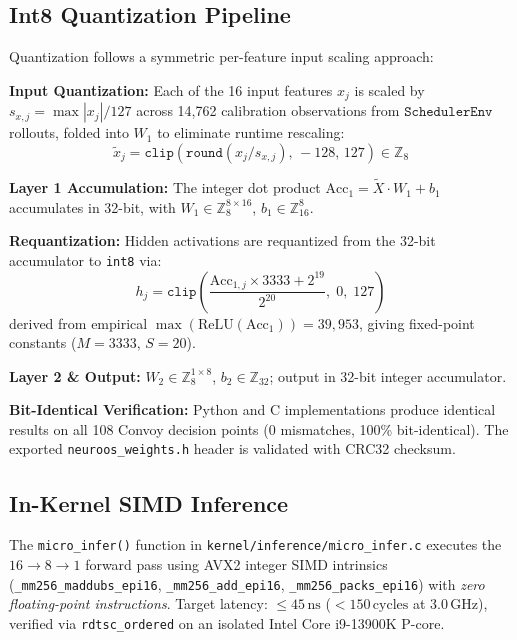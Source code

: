 \subsection{Int8 Quantization Pipeline}
\label{subsec:quant}

Quantization follows a symmetric per-feature input scaling approach:

\textbf{Input Quantization:} Each of the 16 input features $x_j$ is scaled by
$s_{x,j} = \max|x_j| / 127$ across 14{,}762 calibration observations from
$\texttt{SchedulerEnv}$ rollouts, folded into $W_1$ to eliminate runtime
rescaling:
\begin{equation}
  \tilde{x}_{j} = \texttt{clip}\!\left(\texttt{round}(x_j / s_{x,j}),\,-128,\,127\right) \in \mathbb{Z}_8
\end{equation}

\textbf{Layer 1 Accumulation:} The integer dot product
$\text{Acc}_1 = \tilde{X} \cdot W_1 + b_1$ accumulates in 32-bit, with
$W_1 \in \mathbb{Z}_8^{8\times16}$, $b_1 \in \mathbb{Z}_{16}^8$.

\textbf{Requantization:} Hidden activations are requantized from the 32-bit
accumulator to \texttt{int8} via:
\begin{equation}
  h_j = \texttt{clip}\!\left(\frac{\text{Acc}_{1,j} \times 3333 + 2^{19}}{2^{20}},\;0,\;127\right)
  \label{eq:requant}
\end{equation}
derived from empirical $\max(\text{ReLU}(\text{Acc}_1)) = 39{,}953$, giving
fixed-point constants ($M = 3333,\,S = 20$).

\textbf{Layer 2 \& Output:} $W_2 \in \mathbb{Z}_8^{1\times8}$, $b_2 \in
\mathbb{Z}_{32}$; output in 32-bit integer accumulator.

\textbf{Bit-Identical Verification:} Python and C implementations produce
identical results on all 108 Convoy decision points (0 mismatches, 100\%
bit-identical). The exported \texttt{neuroos\_weights.h} header is validated
with CRC32 checksum.

\subsection{In-Kernel SIMD Inference}
\label{subsec:simd}

The \texttt{micro\_infer()} function in \texttt{kernel/inference/micro\_infer.c}
executes the $16\to 8\to 1$ forward pass using AVX2 integer SIMD
intrinsics (\texttt{\_mm256\_maddubs\_epi16}, \texttt{\_mm256\_add\_epi16},
\texttt{\_mm256\_packs\_epi16}) with \emph{zero floating-point instructions}.
Target latency: $\le 45\,\text{ns}$ ($<150\,\text{cycles}$ at
$3.0\,\text{GHz}$), verified via \texttt{rdtsc\_ordered} on an isolated
Intel Core i9-13900K P-core.

